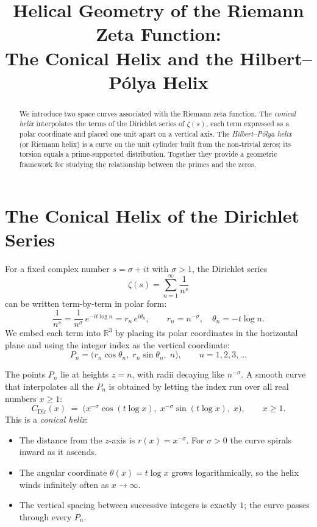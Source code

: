 \documentclass[12pt,a4paper]{article}
\title{\bf Helical Geometry of the Riemann Zeta Function:\\ 
The Conical Helix and the Hilbert--P\'olya Helix}
\author{}
\date{}
\begin{document}
\maketitle

\begin{abstract}
We introduce two space curves associated with the Riemann zeta function.  
The \emph{conical helix} interpolates the terms of the Dirichlet series of \(\zeta(s)\), each term expressed as a polar coordinate and placed one unit apart on a vertical axis.  
The \emph{Hilbert--P\'olya helix} (or Riemann helix) is a curve on the unit cylinder built from the non‑trivial zeros; its torsion equals a prime‑supported distribution.  
Together they provide a geometric framework for studying the relationship between the primes and the zeros.
\end{abstract}

\section{The Conical Helix of the Dirichlet Series}
For a fixed complex number \(s = \sigma + i t\) with \(\sigma > 1\), the Dirichlet series
\[
\zeta(s) = \sum_{n=1}^{\infty} \frac{1}{n^{s}}
\]
can be written term‑by‑term in polar form:
\[
\frac{1}{n^{s}} = \frac{1}{n^{\sigma}}\,e^{-i t \log n}
      = r_n \, e^{i \theta_n},
\qquad
r_n = n^{-\sigma},\quad \theta_n = -t \log n .
\]
We embed each term into \(\mathbb{R}^{3}\) by placing its polar coordinates in the horizontal plane and using the integer index as the vertical coordinate:
\[
P_n = \bigl( r_n \cos \theta_n,\; r_n \sin \theta_n,\; n \bigr),\qquad n = 1,2,3,\dots
\]

The points \(P_n\) lie at heights \(z = n\), with radii decaying like \(n^{-\sigma}\).  
A smooth curve that interpolates all the \(P_n\) is obtained by letting the index run over all real numbers \(x \ge 1\):
\[
\boxed{\;
C_{\text{Dir}}(x) \;=\; \bigl( x^{-\sigma} \cos(t \log x),\; 
                         x^{-\sigma} \sin(t \log x),\; 
                         x \bigr),\qquad x \ge 1 .
\;}
\]
This is a \emph{conical helix}:
\begin{itemize}
\item The distance from the \(z\)-axis is \(r(x) = x^{-\sigma}\).  For \(\sigma > 0\) the curve spirals inward as it ascends.
\item The angular coordinate \(\theta(x) = t \log x\) grows logarithmically, so the helix winds infinitely often as \(x \to \infty\).
\item The vertical spacing between successive integers is exactly \(1\); the curve passes through every \(P_n\).
\end{itemize}
\end{document}
